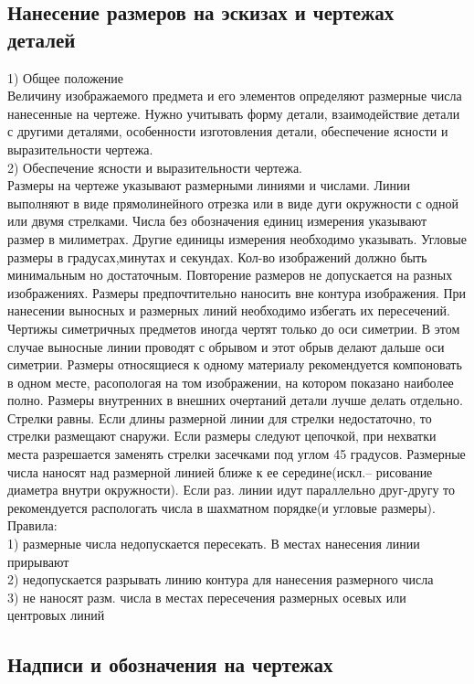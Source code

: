 \documentclass[a4paper, 12pt]{article}
\begin{document}
\subsection{Нанесение размеров на эскизах и чертежах деталей}
1) Общее положение\\
Величину изображаемого предмета и его элементов определяют размерные числа нанесенные на чертеже. Нужно учитывать форму детали, взаимодействие детали с другими деталями, особенности изготовления детали, обеспечение ясности и выразительности чертежа.\\

2) Обеспечение ясности и выразительности чертежа.\\
Размеры на чертеже указывают размерными линиями и числами. Линии выполняют в виде прямолинейного отрезка или в виде дуги окружности с одной или двумя стрелками. Числа без обозначения единиц измерения указывают размер в милиметрах. Другие единицы измерения необходимо указывать. Угловые размеры в градусах,минутах и секундах. Кол-во изображений должно быть минимальным но достаточным. Повторение размеров не допускается на разных изображениях. Размеры предпочтительно наносить вне контура изображения. При нанесении выносных и размерных линий необходимо избегать их пересечений. Чертижы симетричных предметов иногда чертят только до оси симетрии. В этом случае выносные линии проводят с обрывом и этот обрыв делают дальше оси симетрии.
Размеры относящиеся к одному материалу рекомендуется компоновать в одном месте, расопологая на том изображении, на котором показано наиболее полно.
Размеры внутренних в внешних очертаний детали лучше делать отдельно. Стрелки равны. Если длины размерной линии для стрелки недостаточно, то стрелки размещают снаружи. Если размеры следуют цепочкой, при нехватки места разрешается заменять стрелки засечками под углом 45 градусов. Размерные числа наносят над размерной линией ближе к ее середине(искл.-- рисование диаметра внутри окружности). Если раз. линии идут параллельно друг-другу то рекомендуется распологать числа в шахматном порядке(и угловые размеры).\\
Правила:\\
1) размерные числа недопускается пересекать. В местах нанесения линии прирывают\\
2) недопускается разрывать линию контура для нанесения размерного числа\\
3) не наносят разм. числа в местах пересечения размерных осевых или центровых линий\\

\subsection{Надписи и обозначения на чертежах}
\end{document}
